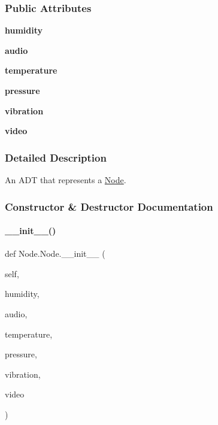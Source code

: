 \subsubsection*{Public Attributes}
\begin{DoxyCompactItemize}
\item 
\mbox{\label{class_node_1_1_node_ac3c76d1698748da739fb4d407fb7881a}} 
{\bfseries humidity}
\item 
\mbox{\label{class_node_1_1_node_a8f3f1bf3d579b4cd1924550585013ea7}} 
{\bfseries audio}
\item 
\mbox{\label{class_node_1_1_node_a26a631c389170ff8fb4ed0dc0bcc366f}} 
{\bfseries temperature}
\item 
\mbox{\label{class_node_1_1_node_a921f527b8a11df292ec09b11c3996912}} 
{\bfseries pressure}
\item 
\mbox{\label{class_node_1_1_node_a5d138882a4d625610237d9ca45c97a7a}} 
{\bfseries vibration}
\item 
\mbox{\label{class_node_1_1_node_affc929c4fc695bc21257763e9967bcb6}} 
{\bfseries video}
\end{DoxyCompactItemize}


\subsubsection{Detailed Description}
An A\+DT that represents a \mbox{\hyperlink{class_node_1_1_node}{Node}}. 

\subsubsection{Constructor \& Destructor Documentation}
\mbox{\label{class_node_1_1_node_aeec2c57379a8099ac1e85e3ad8cf3699}} 
\paragraph{\texorpdfstring{\_\_init\_\_()}{\_\_init\_\_()}}
{\footnotesize\ttfamily def Node.\+Node.\+\_\+\+\_\+init\+\_\+\+\_\+ (\begin{DoxyParamCaption}\item[{}]{self,  }\item[{}]{humidity,  }\item[{}]{audio,  }\item[{}]{temperature,  }\item[{}]{pressure,  }\item[{}]{vibration,  }\item[{}]{video }\end{DoxyParamCaption})}




